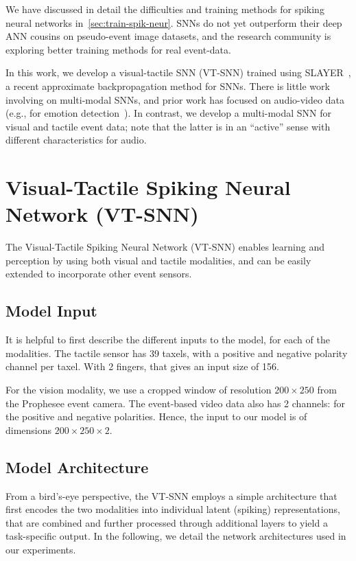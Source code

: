 \documentclass[fyp]{socreport}
\begin{document}
We have discussed in detail the difficulties and training methods for spiking
neural networks in~\autoref{sec:train-spik-neur}. SNNs do not yet outperform
their deep ANN cousins on pseudo-event image datasets, and the research
community is exploring better training methods for real event-data.

In this work, we develop a visual-tactile SNN (VT-SNN) trained using
SLAYER~\cite{NIPS2018_7415}, a recent approximate backpropagation method for
SNNs. There is little work involving on multi-modal SNNs, and prior work has
focused on audio-video data~\cite{chevallier2005distributed,Rathi2018} (e.g.,
for emotion detection~\cite{mansouri2019speech}). In contrast, we develop a
multi-modal SNN for visual and tactile event data; note that the latter is in an
``active'' sense with different characteristics for audio. 

\chapter{Visual-Tactile Spiking Neural Network (VT-SNN)\label{cha:vtsnn}}

The Visual-Tactile Spiking Neural Network (VT-SNN) enables learning and
perception by using both visual and tactile modalities, and can be easily
extended to incorporate other event sensors.

\section{Model Input}

It is helpful to first describe the different inputs to the model, for each of
the modalities. The tactile sensor has 39 taxels, with a positive and negative
polarity channel per taxel. With 2 fingers, that gives an input size of 156.

For the vision modality, we use a cropped window of resolution $200 \times 250$
from the Prophesee event camera. The event-based video data also has 2 channels:
for the positive and negative polarities. Hence, the input to our model is of
dimensions $200 \times 250 \times 2$.

\section{Model Architecture}

From a bird's-eye perspective, the VT-SNN employs a simple architecture that
first encodes the two modalities into individual latent (spiking)
representations, that are combined and further processed through additional
layers to yield a task-specific output. In the following, we detail the network
architectures used in our experiments.
\end{document}
